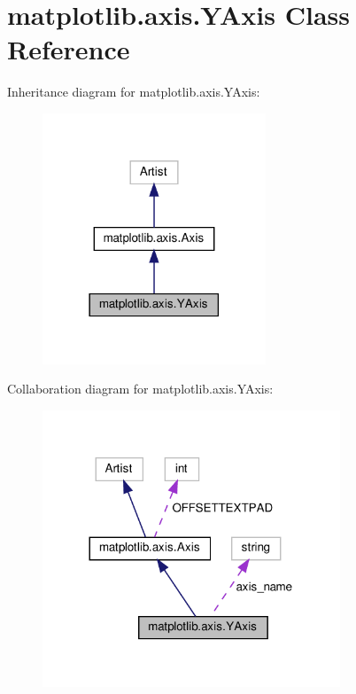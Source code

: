 \hypertarget{classmatplotlib_1_1axis_1_1YAxis}{}\section{matplotlib.\+axis.\+Y\+Axis Class Reference}
\label{classmatplotlib_1_1axis_1_1YAxis}


Inheritance diagram for matplotlib.\+axis.\+Y\+Axis\+:
\nopagebreak
\begin{figure}[H]
\begin{center}
\leavevmode
\includegraphics[width=189pt]{classmatplotlib_1_1axis_1_1YAxis__inherit__graph}
\end{center}
\end{figure}


Collaboration diagram for matplotlib.\+axis.\+Y\+Axis\+:
\nopagebreak
\begin{figure}[H]
\begin{center}
\leavevmode
\includegraphics[width=252pt]{classmatplotlib_1_1axis_1_1YAxis__coll__graph}
\end{center}
\end{figure}
